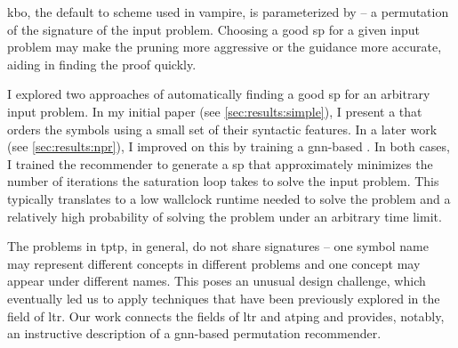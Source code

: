 \Gls{kbo}, the default \gls{to} scheme used in \gls{vampire}, is parameterized by  -- a permutation of the \gls{signature} of the input problem.
Choosing a good \gls{sp} for a given input problem
may make the pruning more aggressive or the guidance more accurate,
aiding in finding the proof quickly.

I explored two approaches of automatically finding a good \gls{sp} for an arbitrary input problem.
In my initial paper \cite{DBLP:conf/cade/Bartek020} (see \cref{sec:results:simple}),
I present a  that orders the symbols using a small set of their syntactic features.
In a later work \cite{DBLP:conf/cade/Bartek021} (see \cref{sec:results:npr}),
I improved on this by training a \acrshort{gnn}-based .
In both cases, I trained the recommender to generate a \gls{sp} that
approximately minimizes the number of iterations the saturation loop takes to solve the input problem.
This typically translates to
a low \gls{wallclock} \gls{runtime} needed to solve the problem and
a relatively high probability of solving the problem under an arbitrary time limit.


The problems in \gls{tptp}, in general, do not share \glspl{signature} -- one symbol name may represent different concepts in different problems and one concept may appear under different names.
This poses an unusual design challenge,
which eventually led us to apply techniques that have been previously explored in the field of \gls{ltr}.
Our work connects the fields of \gls{ltr} and \gls{atping} and provides, notably, an instructive description of a \acrshort{gnn}-based permutation recommender.

